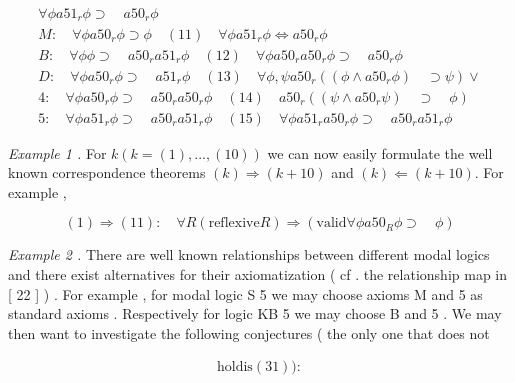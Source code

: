 \documentclass[10pt]{article}
\begin{document}
\begin{align*}
 \forall  \phi   a51 _{ r }  \phi   \supset  \quad  a50 _{ r }  \phi \tag*{$ (  1  6  ) $}\\ M   :  \quad  \forall  \phi   a50 _{ r }  \phi   \supset   \phi  \quad  (  1  1  )  \quad  \forall  \phi   a51 _{ r }  \phi   \Leftrightarrow   a50 _{ r }  \phi \tag*{$ (  1  7  ) $}\\ B   :  \quad  \forall  \phi   \phi   \supset  \quad  a50 _{ r }  a51 _{ r }  \phi  \quad  (  1  2  )  \quad  \forall  \phi   a50 _{ r }  a50 _{ r }  \phi   \supset  \quad  a50 _{ r }  \phi \tag*{$ (  1  8  ) $}\\ D   :  \quad  \forall  \phi   a50 _{ r }  \phi   \supset  \quad  a51 _{ r }  \phi  \quad  (  1  3  )  \quad  \forall  \phi  ,   \psi   a50 _{ r }  (  (  \phi   \wedge   a50 _{ r }  \phi  )  \quad  \supset   \psi  )   \vee \\ 4   :  \quad  \forall  \phi   a50 _{ r }  \phi   \supset  \quad  a50 _{ r }  a50 _{ r }  \phi  \quad  (  1  4  )  \quad  a50 _{ r }  (  (  \psi   \wedge   a50 _{ r }  \psi  )  \quad  \supset  \quad  \phi  ) \tag*{$ (  1  9  ) $}\\ 5   :  \quad  \forall  \phi   a51 _{ r }  \phi   \supset  \quad  a50 _{ r }  a51 _{ r }  \phi  \quad  (  1  5  )  \quad  \forall  \phi   a51 _{ r }  a50 _{ r }  \phi   \supset  \quad  a50 _{ r }  a51 _{ r }  \phi \tag*{$ (  20  ) $}
\end{align*}

\noindent \textit{Example 1 . } \quad For  $ k   (  k   =   (  1  )  ,   .   .   .   ,   (  1  0  )  ) $  we can now easily formulate the well known 
 correspondence theorems  $ (  k  )   \Rightarrow   (  k   +   1  0  ) $  and  $ (  k  )   \Leftarrow   (  k   +   1  0  )  . $  For example , 

\[ (  1  )   \Rightarrow   (  1  1  )   :  \quad  \forall  R   (  \mathrm{re fl exive}   R  )   \Rightarrow   (  \mathrm{valid}   \forall  \phi   a50 _{ R }  \phi   \supset  \quad  \phi  ) \]


\noindent \textit{Example 2 . } \quad There are well known relationships between different modal logics 
 and there exist alternatives for their axiomatization ( cf . the relationship map 
 in [ 22 ] ) . For example , for modal logic S 5 we may choose axioms M and 5 as 
 standard axioms . Respectively for logic KB 5 we may choose B and 5 . We may 
 then want to investigate the following conjectures ( the only one that does not 

\begin{align*}
 \mathrm{hold}   \mathrm{is}   (  3  1  )  )  : 
\end{align*}
\end{document}
